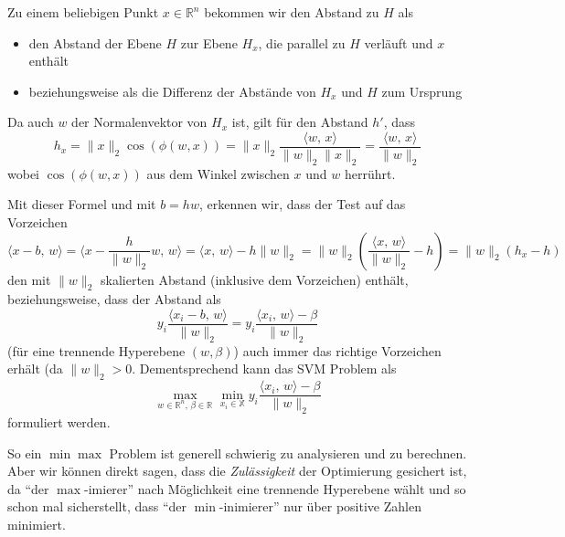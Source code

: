 \documentclass[
]{book}
\providecommand{\tightlist}{%
  \setlength{\itemsep}{0pt}\setlength{\parskip}{0pt}}
\theoremstyle{definition}
\theoremstyle{definition}
\theoremstyle{definition}
\theoremstyle{definition}
\theoremstyle{remark}
\begin{document}
Zu einem beliebigen Punkt \(x\in \mathbb R^{n}\) bekommen wir den Abstand zu \(H\)
als

\begin{itemize}
\tightlist
\item
  den Abstand der Ebene \(H\) zur Ebene \(H_x\), die parallel zu \(H\) verläuft
  und \(x\) enthält
\item
  beziehungsweise als die Differenz der Abstände von \(H_x\) und \(H\) zum Ursprung
\end{itemize}

Da auch \(w\) der Normalenvektor von \(H_x\) ist, gilt für den Abstand \(h'\),
dass
\begin{equation*}
h_x = \|x\|_2\cos(\phi(w,x))=\|x\|_2 \frac{\bigl \langle w, \, x\bigr\rangle  }{\|w\|_2\|x\|_2} = \frac{\bigl \langle w, \, x\bigr\rangle }{\|w\|_2}
\end{equation*}
wobei
\(\cos(\phi(w, x))\)
aus dem Winkel zwischen \(x\) und \(w\) herrührt.

Mit dieser Formel und mit \(b=hw\), erkennen wir, dass der Test auf das Vorzeichen
\begin{equation*}
\bigl \langle x-b, \, w\bigr\rangle  = \bigl \langle x-\frac{h}{\|w\|_2} w, \, w\bigr\rangle  = \bigl \langle x, \, w\bigr\rangle  - h\|w\|_2
= \|w\|_2 (\frac{\bigl \langle x, \, w\bigr\rangle  }{\|w\|_2} - h) = \|w\|_2(h_x - h)
\end{equation*}
den mit \(\|w\|_2\) skalierten Abstand (inklusive dem Vorzeichen) enthält,
beziehungsweise, dass der Abstand als
\begin{equation*}
y_i\frac{\bigl \langle x_i-b, \, w\bigr\rangle }{\|w\|_2} = y_i\frac{\bigl \langle x_i, \, w\bigr\rangle -\beta}{\|w\|_2}
\end{equation*}
(für eine trennende Hyperebene \((w, \beta)\)) auch immer das richtige Vorzeichen erhält (da \(\|w\|_2>0\). Dementsprechend kann das SVM Problem als
\begin{equation*}
\max_{w\in \mathbb R^{n}, \, \beta \in \mathbb R^{}} \min_{x_i \in \mathbb X} y_i\frac{\bigl \langle x_i, \, w\bigr\rangle -\beta}{\|w\|_2}
\end{equation*}
formuliert werden.

So ein \(\min \max\) Problem ist generell schwierig zu analysieren und zu
berechnen. Aber wir können direkt sagen, dass die \emph{Zulässigkeit} der Optimierung gesichert
ist, da ``der \(\max\)-imierer'' nach Möglichkeit eine trennende Hyperebene
wählt und so schon mal sicherstellt, dass ``der \(\min\)-inimierer'' nur
über positive Zahlen minimiert.
\end{document}
